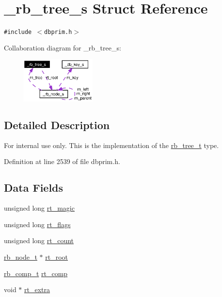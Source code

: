 \hypertarget{struct__rb__tree__s}{
\section{\_\-rb\_\-tree\_\-s Struct Reference}
\label{struct__rb__tree__s}
}
{\tt \#include $<$dbprim.h$>$}

Collaboration diagram for \_\-rb\_\-tree\_\-s:\begin{figure}[H]
\begin{center}
\leavevmode
\includegraphics[width=107pt]{struct__rb__tree__s__coll__graph}
\end{center}
\end{figure}


\subsection{Detailed Description}
\begin{Desc}
\item[For internal use only.]
This is the implementation of the \hyperlink{group__dbprim__rbtree_ga0}{rb\_\-tree\_\-t} type.\end{Desc}




Definition at line 2539 of file dbprim.h.\subsection*{Data Fields}
\begin{CompactItemize}
\item 
unsigned long \hyperlink{struct__rb__tree__s_o0}{rt\_\-magic}
\item 
unsigned long \hyperlink{struct__rb__tree__s_o1}{rt\_\-flags}
\item 
unsigned long \hyperlink{struct__rb__tree__s_o2}{rt\_\-count}
\item 
\hyperlink{struct__rb__node__s}{rb\_\-node\_\-t} $\ast$ \hyperlink{struct__rb__tree__s_o3}{rt\_\-root}
\item 
\hyperlink{group__dbprim__rbtree_ga3}{rb\_\-comp\_\-t} \hyperlink{struct__rb__tree__s_o4}{rt\_\-comp}
\item 
void $\ast$ \hyperlink{struct__rb__tree__s_o5}{rt\_\-extra}
\end{CompactItemize}


